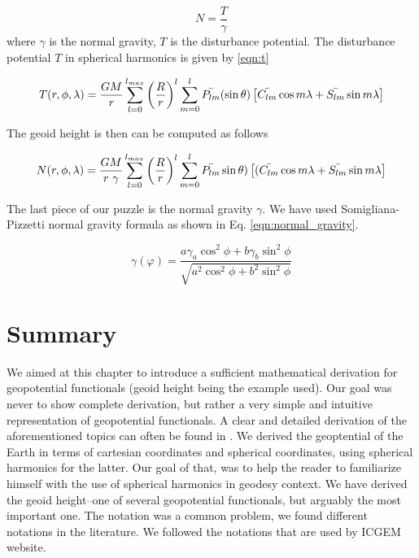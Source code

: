 \begin{equation}
\label{eqn:brums}
N = \frac{T}{\gamma}
\end{equation}
where $\gamma$ is the normal gravity, $T$ is the disturbance potential. The disturbance potential $T$ in spherical harmonics is given by \ref{eqn:t}

\begin{equation}
\label{eqn:t}
T(r, \phi, \lambda) = \frac{GM}{r}\sum_{l=0}^{l_{max}}\left(\frac{R}{r}\right)^{l}\sum_{m=0}^{l}\bar{P_{lm}}(\sin \theta)\left[\bar{C_{lm}} \cos m \lambda \\
+ \bar{S_{lm}} \sin m \lambda\right]
\end{equation}

The geoid height is then can be computed as follows

\begin{equation}
\label{eqn:n}
N(r, \phi, \lambda) = \frac{GM}{r\ \gamma}\sum_{l=0}^{l_{max}}\left(\frac{R}{r}\right)^{l}\sum_{m=0}^{l}\bar{P_{lm}}\sin \theta)\left[(\bar{C_{lm}} \cos m \lambda \\
+ \bar{S_{lm}} \sin m \lambda\right]
\end{equation}

The last piece of our puzzle is the normal gravity $\gamma$. We have used Somigliana-Pizzetti normal gravity formula as shown in Eq. \ref{eqn:normal_gravity}.

\begin{equation}
\label{eqn:normal_gravity}
\gamma(\varphi) = \frac{a \gamma_a \cos^2 \phi + b \gamma_b \sin^2\phi}{\sqrt{a^2 \cos^2 \phi + b^2 \sin^2 \phi}}
\end{equation} 


\section{Summary}

We aimed at this chapter to introduce a sufficient mathematical derivation for geopotential functionals (geoid height being the example used). Our goal was never to show complete derivation, but rather a very simple and intuitive representation of geopotential functionals. A clear and detailed derivation of the aforementioned topics can often be found in \citep{hofmann, nico, petrphysical}. We derived the geoptential of the Earth in terms of cartesian coordinates and spherical coordinates, using spherical harmonics for the latter. Our goal of that, was to help the reader to familiarize himself with the use of spherical harmonics in geodesy context. We have derived the geoid height--one of several geopotential functionals, but arguably the most important one. The notation was a common problem, we found different notations in the literature. We followed the notations that are used by ICGEM website.




